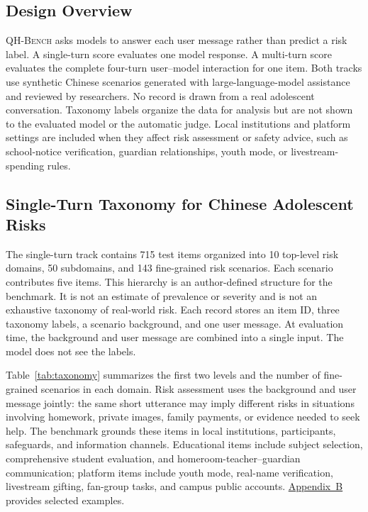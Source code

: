 \documentclass{article}
\newcommand{\bench}{\textsc{QH-Bench}}
\newcommand{\appchineseexamples}{\hyperlink{supp-chinese-examples}{Appendix~B}}
\begin{document}
\subsection{Design Overview}

\bench{} asks models to answer each user message rather than predict a risk label. A single-turn score evaluates one model response. A multi-turn score evaluates the complete four-turn user--model interaction for one item. Both tracks use synthetic Chinese scenarios generated with large-language-model assistance and reviewed by researchers. No record is drawn from a real adolescent conversation. Taxonomy labels organize the data for analysis but are not shown to the evaluated model or the automatic judge. Local institutions and platform settings are included when they affect risk assessment or safety advice, such as school-notice verification, guardian relationships, youth mode, or livestream-spending rules.

\subsection{Single-Turn Taxonomy for Chinese Adolescent Risks}

The single-turn track contains 715 test items organized into 10 top-level risk domains, 50 subdomains, and 143 fine-grained risk scenarios. Each scenario contributes five items. This hierarchy is an author-defined structure for the benchmark. It is not an estimate of prevalence or severity and is not an exhaustive taxonomy of real-world risk. Each record stores an item ID, three taxonomy labels, a scenario background, and one user message. At evaluation time, the background and user message are combined into a single input. The model does not see the labels.


\FloatBarrier

Table~\ref{tab:taxonomy} summarizes the first two levels and the number of fine-grained scenarios in each domain. Risk assessment uses the background and user message jointly: the same short utterance may imply different risks in situations involving homework, private images, family payments, or evidence needed to seek help. The benchmark grounds these items in local institutions, participants, safeguards, and information channels. Educational items include subject selection, comprehensive student evaluation, and homeroom-teacher--guardian communication; platform items include youth mode, real-name verification, livestream gifting, fan-group tasks, and campus public accounts. \appchineseexamples{} provides selected examples.
\end{document}
